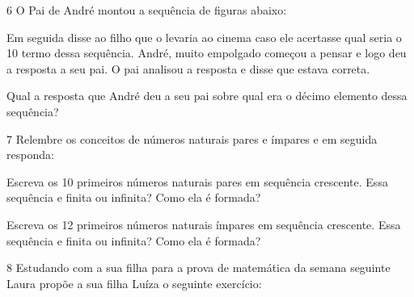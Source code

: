 \num{6} O Pai de André montou a sequência de figuras abaixo:


Em seguida disse ao filho que o levaria ao cinema caso ele acertasse
qual seria o 10 termo dessa sequência. André, muito empolgado começou a
pensar e logo deu a resposta a seu pai. O pai analisou a resposta e
disse que estava correta.

Qual a resposta que André deu a seu pai sobre qual era o décimo elemento
dessa sequência?



\num{7} Relembre os conceitos de números naturais pares e ímpares e em
seguida responda:

\begin{escolha}
\item
  Escreva os 10 primeiros números naturais pares em sequência crescente.
  Essa sequência e finita ou infinita? Como ela é formada?



\item
  Escreva os 12 primeiros números naturais ímpares em sequência
  crescente. Essa sequência e finita ou infinita? Como ela é formada?


\end{escolha}

\num{8} Estudando com a sua filha para a prova de matemática da semana
seguinte Laura propõe a sua filha Luíza o seguinte exercício:

